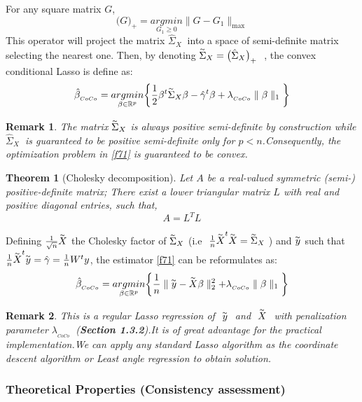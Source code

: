 \documentclass[12pt]{report}
\newtheorem{theoreme}{Theorem}[section] %
\newtheorem{remarque}{Remark}[section]
\begin{document}
For any square matrix $G$, 
\begin{equation}
	\big(G\big)_{+}=\underset{G_{1}\geq0}{argmin}\parallel G-G_{1}\parallel_{\max}
	\label{f70}
\end{equation}
This operator will project the matrix  $\hat{\Sigma}_{X}\ $ into a space of semi-definite matrix selecting the nearest one. Then, by denoting $\overset{_{\thicksim}}{\Sigma}_{X}=\big(\hat{\Sigma}_{X}\big)_{+}\ $ , the convex conditional Lasso is define as:
\begin{equation}
\hat{\beta}_{_{CoCo}}= \underset{\beta \in \mathbb{R}^{p}}{argmin}\bigg\{\frac{1}{2}\beta^{t}\overset{_{\thicksim}}{\Sigma}_{X}\beta-\hat{\gamma}^{t}\beta+\lambda_{_{CoCo}}\parallel\beta\parallel_{1}\bigg\}
\label{f71}
\end{equation}
\begin{remarque}
	The matrix $\overset{_{\thicksim}}{\Sigma}_{X}$ is always positive semi-definite by construction while  $\hat{\Sigma}_{X}\ $ is guaranteed to be positive semi-definite only for $p<n$.Consequently, the optimization problem in \eqref{f71} is guaranteed to be convex.
\end{remarque}
\begin{theoreme}[Cholesky decomposition]
	Let $A$ be a real-valued symmetric (semi-) positive-definite matrix; There exist a lower triangular matrix $L$ with real and positive diagonal entries, such that,
	\begin{equation}
		A=L^{T}L
		\label{f72}
	\end{equation}
\end{theoreme}
Defining $ \frac{1}{\sqrt{n}}\overset{_{\thicksim}}{X}$ the Cholesky factor of  $\overset{_{\thicksim}}{\Sigma}_{X}$ (i.e $\ \frac{1}{n}\overset{_{\thicksim}}{X}^{t}\overset{_{\thicksim}}{X}=\overset{_{\thicksim}}{\Sigma}_{X}\ $) and $\overset{_{\thicksim}}{y}$ such that $\frac{1}{n}\overset{_{\thicksim}}{X}^{t}\overset{_{\thicksim}}{y}=\hat{\gamma}=\frac{1}{n}W^{t}y$, the estimator \eqref{f71} can be reformulates as:
\begin{equation}
\hat{\beta}_{_{CoCo}}= \underset{\beta \in \mathbb{R}^{p}}{argmin}\bigg\{\frac{1}{n}\parallel \overset{_{\thicksim}}{y}- \overset{_{\thicksim}}{X}\beta \parallel^{2}_{2}+\lambda_{_{CoCo}}\parallel\beta\parallel_{1}\bigg\}
\label{f73}
\end{equation}

\begin{remarque}
	This is a regular Lasso regression of $\ \overset{_{\thicksim}}{y}\ $ and $\ \overset{_{\thicksim}}{X}\ $ with penalization parameter $\lambda_{_{CoCo}}\ $ (\textbf{Section 1.3.2}).It is of great advantage for the practical implementation.We can apply any standard Lasso algorithm as the \textit{ coordinate descent algorithm \cite{nref20} or Least angle regression \cite{nref21} } to obtain solution.
\end{remarque}
\begin{center}
	\subsubsection{Theoretical Properties (Consistency assessment)}
\end{center}
\end{document}
